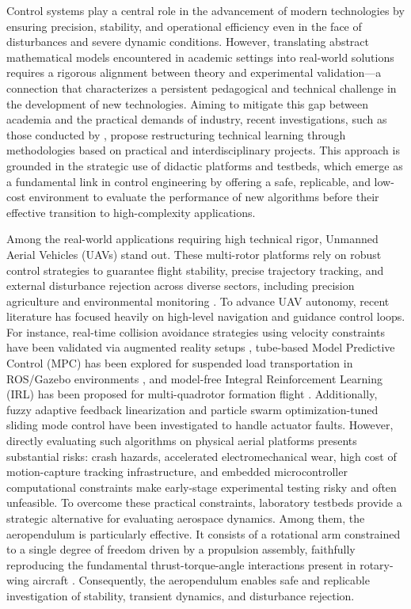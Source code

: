\documentclass[pdflatex,sn-mathphys-num,iicol]{sn-jnl}
\theoremstyle{thmstyleone}%
\theoremstyle{thmstyletwo}%
\theoremstyle{thmstylethree}%
\begin{document}
Control systems play a central role in the advancement of modern technologies by ensuring precision, stability, and operational efficiency even in the face of disturbances and severe dynamic conditions. However, translating abstract mathematical models encountered in academic settings into real-world solutions requires a rigorous alignment between theory and experimental validation—a connection that characterizes a persistent pedagogical and technical challenge in the development of new technologies. 
Aiming to mitigate this gap between academia and the practical demands of industry, recent investigations, such as those conducted by \citet{antunes2026improving}, propose restructuring technical learning through methodologies based on practical and interdisciplinary projects. This approach is grounded in the strategic use of didactic platforms and testbeds, which emerge as a fundamental link in control engineering by offering a safe, replicable, and low-cost environment to evaluate the performance of new algorithms before their effective transition to high-complexity applications.

Among the real-world applications requiring high technical rigor, Unmanned Aerial Vehicles (UAVs) stand out. These multi-rotor platforms rely on robust control strategies to guarantee flight stability, precise trajectory tracking, and external disturbance rejection across diverse sectors, including precision agriculture \citep{anziliero2021tecnicas} and environmental monitoring \citep{policarpo2025camera}. To advance UAV autonomy, recent literature has focused heavily on high-level navigation and guidance control loops. For instance, real-time collision avoidance strategies using velocity constraints have been validated via augmented reality setups \citep{ricardo2024robust}, tube-based Model Predictive Control (MPC) has been explored for suspended load transportation in ROS/Gazebo environments \citep{andrade2024tube}, and model-free Integral Reinforcement Learning (IRL) has been proposed for multi-quadrotor formation flight \citep{dinh2025model}. Additionally, fuzzy adaptive feedback linearization \citep{aghazamani2025position} and particle swarm optimization-tuned sliding mode control \citep{benayad2025hybrid} have been investigated to handle actuator faults. However, directly evaluating such algorithms on physical aerial platforms presents substantial risks: crash hazards, accelerated electromechanical wear, high cost of motion-capture tracking infrastructure, and embedded microcontroller computational constraints make early-stage experimental testing risky and often unfeasible.
To overcome these practical constraints, laboratory testbeds provide a strategic alternative for evaluating aerospace dynamics. Among them, the aeropendulum is particularly effective. It consists of a rotational arm constrained to a single degree of freedom driven by a propulsion assembly, faithfully reproducing the fundamental thrust-torque-angle interactions present in rotary-wing aircraft \citep{tanveer2023robust, rojas2024hunting}. Consequently, the aeropendulum enables safe and replicable investigation of stability, transient dynamics, and disturbance rejection.
\end{document}
